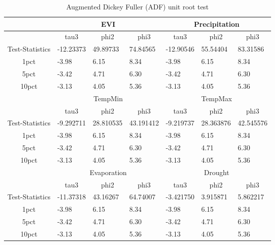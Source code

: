 \begin{table}[]
	\label{table:(ADF) unit root test}
	\caption{Augmented Dickey Fuller (ADF) unit root test }
	\centering
	\small
	\addtolength{\tabcolsep}{2pt}
	\begin{tabularx}{\textwidth}{@{}cllllll@{}}
		\toprule
		& \multicolumn{3}{c}{EVI}   & \multicolumn{3}{c}{Precipitation}  \\ \midrule
		\multicolumn{1}{c}{} & \multicolumn{1}{c}{tau3} & \multicolumn{1}{c}{phi2} & \multicolumn{1}{c}{phi3} & \multicolumn{1}{c}{tau3} & \multicolumn{1}{c}{phi2} &\multicolumn{1}{c}{phi3}\\ \midrule
		
		Test-Statistics&-12.23373&49.89733&74.84565&-12.90546&55.54404&83.31586\\
		1pct&-3.98&6.15&8.34&-3.98&6.15&8.34\\
		5pct&-3.42&4.71&6.30&-3.42&4.71&6.30\\
		10pct&-3.13&4.05&5.36&-3.13&4.05&5.36\\ \bottomrule
		& \multicolumn{3}{c}{TempMin}   & \multicolumn{3}{c}{TempMax}  \\ \midrule
		\multicolumn{1}{c}{} & \multicolumn{1}{c}{tau3} & \multicolumn{1}{c}{phi2} & \multicolumn{1}{c}{phi3} & \multicolumn{1}{c}{tau3} & \multicolumn{1}{c}{phi2} &\multicolumn{1}{c}{phi3}\\ \midrule
		
		Test-Statistics&-9.292711&28.810535&43.191412&-9.219737&28.363876&42.545576\\
		1pct&-3.98&6.15&8.34&-3.98&6.15&8.34\\
		5pct&-3.42&4.71&6.30&-3.42&4.71&6.30\\
		10pct&-3.13&4.05&5.36&-3.13&4.05&5.36\\ \bottomrule
		
		& \multicolumn{3}{c}{Evaporation}   & \multicolumn{3}{c}{Drought}  \\ \midrule
		\multicolumn{1}{c}{} & \multicolumn{1}{c}{tau3} & \multicolumn{1}{c}{phi2} & \multicolumn{1}{c}{phi3} & \multicolumn{1}{c}{tau3} & \multicolumn{1}{c}{phi2} &\multicolumn{1}{c}{phi3}\\ \midrule
		
		Test-Statistics&-11.37318&43.16267&64.74007&-3.421750&3.915871&5.862217\\
		1pct&-3.98&6.15&8.34&-3.98&6.15&8.34\\
		5pct&-3.42&4.71&6.30&-3.42&4.71&6.30\\
		10pct&-3.13&4.05&5.36&-3.13&4.05&5.36\\
		
		\midrule\bottomrule
	\end{tabularx}
\end{table}
